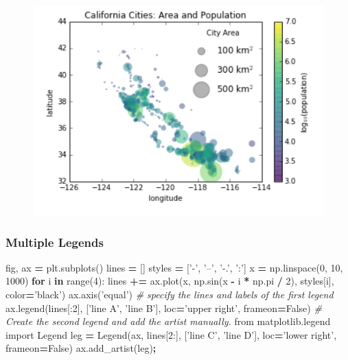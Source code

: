 \documentclass[]{book}
\newenvironment{Shaded}{\begin{snugshade}}{\end{snugshade}}
\newcommand{\KeywordTok}[1]{\textcolor[rgb]{0.13,0.29,0.53}{\textbf{#1}}}
\newcommand{\DecValTok}[1]{\textcolor[rgb]{0.00,0.00,0.81}{#1}}
\newcommand{\StringTok}[1]{\textcolor[rgb]{0.31,0.60,0.02}{#1}}
\newcommand{\ImportTok}[1]{#1}
\newcommand{\CommentTok}[1]{\textcolor[rgb]{0.56,0.35,0.01}{\textit{#1}}}
\newcommand{\VariableTok}[1]{\textcolor[rgb]{0.00,0.00,0.00}{#1}}
\newcommand{\ControlFlowTok}[1]{\textcolor[rgb]{0.13,0.29,0.53}{\textbf{#1}}}
\newcommand{\OperatorTok}[1]{\textcolor[rgb]{0.81,0.36,0.00}{\textbf{#1}}}
\newcommand{\BuiltInTok}[1]{#1}
\newcommand{\NormalTok}[1]{#1}
\theoremstyle{definition}
\theoremstyle{definition}
\theoremstyle{definition}
\theoremstyle{remark}
\begin{document}
\begin{figure}
\centering
\includegraphics{images/legend4.png}
\caption{}
\end{figure}

\subsubsection{Multiple Legends}\label{multiple-legends}

\begin{Shaded}
\begin{Highlighting}[]
\NormalTok{fig, ax }\OperatorTok{=}\NormalTok{ plt.subplots()}
\NormalTok{lines }\OperatorTok{=}\NormalTok{ []}
\NormalTok{styles }\OperatorTok{=}\NormalTok{ [}\StringTok{'-'}\NormalTok{, }\StringTok{'--'}\NormalTok{, }\StringTok{'-.'}\NormalTok{, }\StringTok{':'}\NormalTok{]}
\NormalTok{x }\OperatorTok{=}\NormalTok{ np.linspace(}\DecValTok{0}\NormalTok{, }\DecValTok{10}\NormalTok{, }\DecValTok{1000}\NormalTok{)}
\ControlFlowTok{for}\NormalTok{ i }\KeywordTok{in} \BuiltInTok{range}\NormalTok{(}\DecValTok{4}\NormalTok{):}
\NormalTok{    lines }\OperatorTok{+=}\NormalTok{ ax.plot(x, np.sin(x }\OperatorTok{-}\NormalTok{ i }\OperatorTok{*}\NormalTok{ np.pi }\OperatorTok{/} \DecValTok{2}\NormalTok{),}
\NormalTok{                     styles[i], color}\OperatorTok{=}\StringTok{'black'}\NormalTok{)}
\NormalTok{ax.axis(}\StringTok{'equal'}\NormalTok{)}
\CommentTok{# specify the lines and labels of the first legend}
\NormalTok{ax.legend(lines[:}\DecValTok{2}\NormalTok{], [}\StringTok{'line A'}\NormalTok{, }\StringTok{'line B'}\NormalTok{],}
\NormalTok{          loc}\OperatorTok{=}\StringTok{'upper right'}\NormalTok{, frameon}\OperatorTok{=}\VariableTok{False}\NormalTok{)}
\CommentTok{# Create the second legend and add the artist manually.}
\ImportTok{from}\NormalTok{ matplotlib.legend }\ImportTok{import}\NormalTok{ Legend}
\NormalTok{leg }\OperatorTok{=}\NormalTok{ Legend(ax, lines[}\DecValTok{2}\NormalTok{:], [}\StringTok{'line C'}\NormalTok{, }\StringTok{'line D'}\NormalTok{],}
\NormalTok{             loc}\OperatorTok{=}\StringTok{'lower right'}\NormalTok{, frameon}\OperatorTok{=}\VariableTok{False}\NormalTok{)}
\NormalTok{ax.add_artist(leg)}\OperatorTok{;}
\end{Highlighting}
\end{Shaded}
\end{document}
